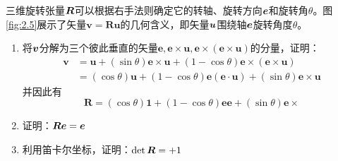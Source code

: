 \begin{exercise}
\begin{figure}[htbp]
    \end{figure}
    \item 三维旋转张量$\boldsymbol{R}$可以根据右手法则确定它的转轴、旋转方向$\boldsymbol{e}$和旋转角$\theta$。图\ref{fig:2.5}展示了矢量$\boldsymbol{v}=\boldsymbol{Ru}$的几何含义，即矢量$\boldsymbol{u}$围绕轴$\boldsymbol{e}$旋转角度$\theta $。
    \begin{enumerate}
        \item 将$\boldsymbol{v}$分解为三个彼此垂直的矢量$\boldsymbol{e},\boldsymbol{e}\times \boldsymbol{u},\boldsymbol{e}\times \left( \boldsymbol{e}\times \boldsymbol{u} \right) $的分量，证明：
        \begin{equation*}
            \begin{aligned}
                \boldsymbol{v}&=\boldsymbol{u}+\left( \sin \theta \right) \boldsymbol{e}\times \boldsymbol{u}+\left( 1-\cos \theta \right) \boldsymbol{e}\times \left( \boldsymbol{e}\times \boldsymbol{u} \right)\\
                &=\left( \cos \theta \right) \boldsymbol{u}+\left( 1-\cos \theta \right) \boldsymbol{e}\left( \boldsymbol{e}\cdot \boldsymbol{u} \right) +\left( \sin \theta \right) \boldsymbol{e}\times \boldsymbol{u}
            \end{aligned}
        \end{equation*}
        并因此有
        \begin{equation}\label{equ:2.41}
            \boldsymbol{R}=\left( \cos \theta \right) \mathbf{1}+\left( 1-\cos \theta \right) \boldsymbol{ee}+\left( \sin \theta \right) \boldsymbol{e}\times 
        \end{equation}
        \item 证明：$\boldsymbol{Re}=\boldsymbol{e}$
        \item 利用笛卡尔坐标，证明：$\det \boldsymbol{R}=+1$
        

\end{enumerate}
\end{exercise}
